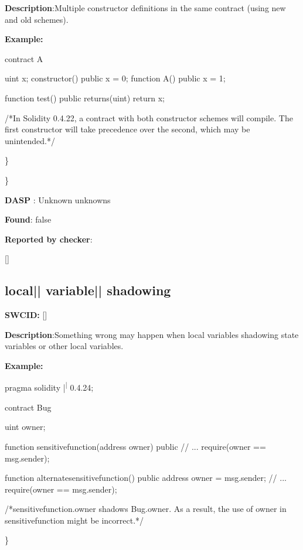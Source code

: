 \documentclass{article}
\begin{document}
\textbf{Description}:Multiple constructor definitions in the same contract (using new and old schemes).


\textbf{Example:} 
\begin{ffcode} 

contract A {
    uint x;
    constructor() public {
        x = 0;
    }
    function A() public {
        x = 1;
    }

    function test() public returns(uint) {
        return x;
    }
}

 /*In Solidity 0.4.22, a contract with both constructor schemes will compile. The first constructor will take precedence over the second, which may be unintended.*/ 

\end{ffcode} 
\} 

\} 

\textbf{DASP} : Unknown unknowns

\textbf{Found}: false

\textbf{Reported by checker}: 
\begin{ffcode} 

[]
\end{ffcode} 
\subsection{local{|\textunderscore| }variable{|\textunderscore| }shadowing} 
\textbf{SWC{\textunderscore }ID:} []

\textbf{Description}:Something wrong may happen when local variables shadowing state variables or other local variables.


\textbf{Example:} 
\begin{ffcode} 

pragma solidity |\textsuperscript| 0.4.24;

contract Bug {
    uint owner;

    function sensitive\textunderscore function(address owner) public {
        // ...
        require(owner == msg.sender);
    }

    function alternate\textunderscore sensitive\textunderscore function() public {
        address owner = msg.sender;
        // ...
        require(owner == msg.sender);
    }
}

 /*sensitive\textunderscore function.owner shadows Bug.owner. As a result, the use of owner in sensitive\textunderscore function might be incorrect.*/ 

\end{ffcode} 
\} 
\end{document}
